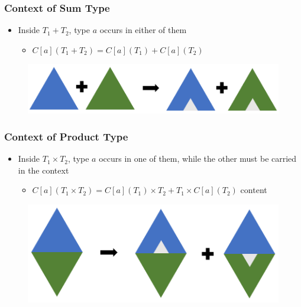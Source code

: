 \begin{frame}
\frametitle{Context of Sum Type}
\begin{itemize}
\item Inside $T_1 + T_2$, type $a$ occurs in either of them
\begin{itemize}
\item $C[a](T_1+T_2) = C[a](T_1) + C[a](T_2)$
\end{itemize}
\end{itemize}

\begin{figure}
\centering
\includegraphics[width=\textwidth]{figure/sum}
\end{figure}
\end{frame}

\begin{frame}
\frametitle{Context of Product Type}
\begin{itemize}
\item Inside $T_1 \times T_2$, type $a$ occurs in one of them,
while the other must be carried in the context
\begin{itemize}
\item $C[a](T_1\times T_2) = C[a](T_1)\times T_2 + T_1\times C[a](T_2)$
content
\end{itemize}
\end{itemize}

\begin{figure}
\centering
\includegraphics[width=\textwidth]{figure/prod}
\end{figure}
\end{frame}

